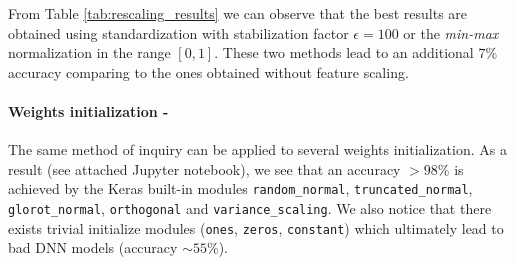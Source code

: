 From Table \ref{tab:rescaling_results} we can observe that the best results are obtained using standardization with stabilization factor $\epsilon = 100$ or the \emph{min-max} normalization in the range $[0, 1]$. These two methods lead to an additional $7\%$ accuracy comparing to the ones obtained without feature scaling.


\vspace{7pt}

\paragraph{\textbf{Weights initialization - }} The same method of inquiry can be applied to several weights initialization. As a result (see attached Jupyter notebook), we see that an accuracy $>98\%$ is achieved by the Keras built-in modules \texttt{random\_normal}, \texttt{truncated\_normal}, \texttt{glorot\_normal}, \texttt{orthogonal} and \texttt{variance\_scaling}. We also notice that there exists trivial initialize modules (\texttt{ones}, \texttt{zeros}, \texttt{constant}) which ultimately lead to bad DNN models (accuracy $\sim 55\%$).

